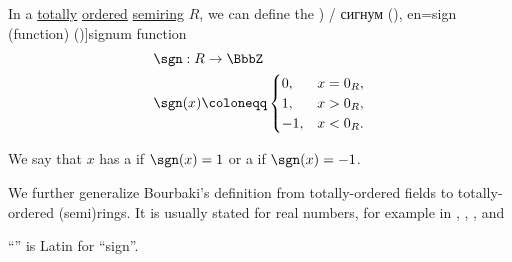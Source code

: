 \begin{definition}\label{def:signum}
  In a \hyperref[def:totally_ordered_set]{totally} \hyperref[def:ordered_semiring]{ordered} \hyperref[def:semiring]{semiring} \( R \), we can define the \term[ru=знак (\cite[208]{Гончаров1952ФункцииДействительногоПеременного}) / сигнум (\cite[100]{Зорич2019АнализЧасть1}), en=sign (function) (\cite[\S 2.2(c)]{Schechter1997AnalysisHandbook})]{signum} function
  \begin{equation*}
    \begin{aligned}
      &\sgn: R \to \BbbZ \\
      &\sgn(x) \coloneqq \begin{cases}
        0,  &x = 0_R, \\
        1,  &x > 0_R, \\
        -1, &x < 0_R.
      \end{cases}
    \end{aligned}
  \end{equation*}

  We say that \( x \) has a  if \( \sgn(x) = 1 \) or a  if \( \sgn(x) = -1 \).
\end{definition}
\begin{comments}
  \item We further generalize Bourbaki's definition from totally-ordered fields to totally-ordered (semi)rings. It is usually stated for real numbers, for example in
  \cite[\S 2.2(c)]{Schechter1997AnalysisHandbook},
  \cite[example 9.3.17]{Tao2022AnalysisI},
  \cite[208]{Гончаров1952ФункцииДействительногоПеременного},
  \cite[107]{ИльинСадовничийСендов1985АнализТом1} and
  \cite[100]{Зорич2019АнализЧасть1}

  \item \enquote{} is Latin for \enquote{sign}.
\end{comments}

